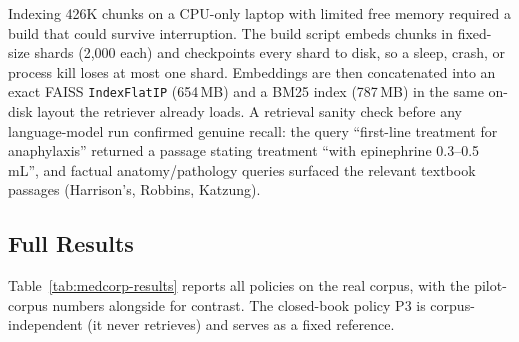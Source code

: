 Indexing 426K chunks on a CPU-only laptop with limited free memory required a
build that could survive interruption. The build script embeds chunks in
fixed-size shards (2{,}000 each) and checkpoints every shard to disk, so a sleep,
crash, or process kill loses at most one shard. Embeddings are then concatenated
into an exact FAISS \texttt{IndexFlatIP} (654\,MB) and a BM25 index (787\,MB) in
the same on-disk layout the retriever already loads. A retrieval sanity check
before any language-model run confirmed genuine recall: the query ``first-line
treatment for anaphylaxis'' returned a passage stating treatment ``with
epinephrine 0.3--0.5\,mL'', and factual anatomy/pathology queries surfaced the
relevant textbook passages (Harrison's, Robbins, Katzung).

\subsection{Full Results}
\label{sec:week4-results}

Table~\ref{tab:medcorp-results} reports all policies on the real corpus, with the
pilot-corpus numbers alongside for contrast. The closed-book policy P3 is
corpus-independent (it never retrieves) and serves as a fixed reference.

